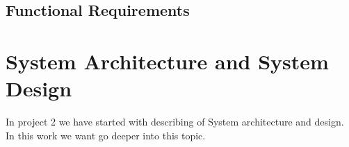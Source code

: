 \documentclass{scrartcl}
\begin{document}
%
%
%
% 
%
%
%
%
%
%
%
% 
%
%
%
%



 
\subsection{Functional Requirements}


\section{System Architecture and System Design}
In project 2 we have started with describing of System architecture and design. In this work we want go deeper into this topic. \\
\end{document}
